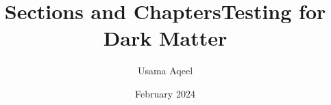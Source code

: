 \documentclass[12pt]{report}
\title{Sections and Chapters}
\title{Testing for Dark Matter}
\author{Usama Aqeel}
\date{February 2024}
\numberwithin{equation}{subsection}
\numberwithin{figure}{subsection}
\numberwithin{equation}{section}
\numberwithin{figure}{section}
\theoremstyle{plain}
\begin{document}
\maketitle
\newpage
\tableofcontents
\newpage

\newpage 

\begin{appendices}


\end{appendices}
\end{document}
